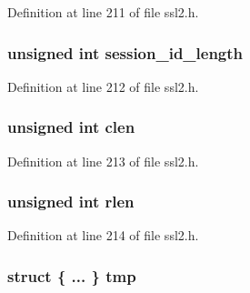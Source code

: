 Definition at line 211 of file ssl2.\+h.

\subsubsection[{\texorpdfstring{session\+\_\+id\+\_\+length}{session_id_length}}]{\setlength{\rightskip}{0pt plus 5cm}unsigned int session\+\_\+id\+\_\+length}\hypertarget{structssl2__state__st_aef3d2a4622055ed0cfb19d9d8f696ec2}{}\label{structssl2__state__st_aef3d2a4622055ed0cfb19d9d8f696ec2}


Definition at line 212 of file ssl2.\+h.

\subsubsection[{\texorpdfstring{clen}{clen}}]{\setlength{\rightskip}{0pt plus 5cm}unsigned int clen}\hypertarget{structssl2__state__st_a6d09b72841914282a450ed092dce6141}{}\label{structssl2__state__st_a6d09b72841914282a450ed092dce6141}


Definition at line 213 of file ssl2.\+h.

\subsubsection[{\texorpdfstring{rlen}{rlen}}]{\setlength{\rightskip}{0pt plus 5cm}unsigned int rlen}\hypertarget{structssl2__state__st_a9749b9b1e812b509dfda17cb1de9296b}{}\label{structssl2__state__st_a9749b9b1e812b509dfda17cb1de9296b}


Definition at line 214 of file ssl2.\+h.

\subsubsection[{\texorpdfstring{tmp}{tmp}}]{\setlength{\rightskip}{0pt plus 5cm}struct \{ ... \}   tmp}\hypertarget{structssl2__state__st_ad2dd07ed874222ee57960a071b8bc75a}{}\label{structssl2__state__st_ad2dd07ed874222ee57960a071b8bc75a}
